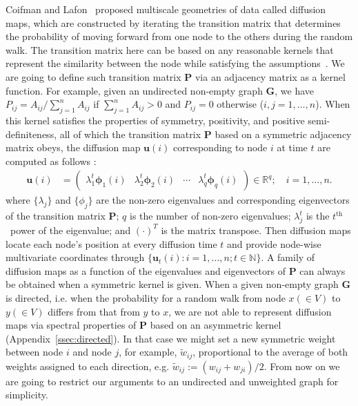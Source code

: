 \documentclass[11pt]{article}
\theoremstyle{definition}
\begin{document}
Coifman and Lafon~\cite{coifman2006diffusion,lafon2006diffusion} proposed multiscale geometries of data called diffusion maps, which are constructed by iterating the transition matrix that determines the probability of moving forward from one node to the others during the random walk. The transition matrix here can be based on any reasonable kernels that represent the similarity between the node while satisfying the assumptions~\cite{coifman2006diffusion, coifman2005geometric}. We are going to define such transition matrix $\mathbf{P}$ via an adjacency matrix as a kernel function. For example, given an undirected non-empty graph $\mathbf{G}$, we have $P_{ij} = A_{ij} / \sum\limits_{j=1}^{n} A_{ij}$ if $\sum\limits_{j=1}^{n} A_{ij} > 0$ and $P_{ij} = 0$ otherwise ($i,j=1,\ldots,n$). When this kernel satisfies the properties of symmetry, positivity, and positive semi-definiteness, all of which the transition matrix $\mathbf{P}$ based on a symmetric adjacency matrix obeys, the diffusion map $\mathbf{u}(i)$ corresponding to node $i$ at time $t$ are computed as follows : 
\begin{align}
\mathbf{u}(i)  &= \begin{pmatrix} \lambda^{t}_{1} \mathbf{\phi}_{1}(i) & \lambda^{t}_{2} \mathbf{\phi}_{2} (i)  & \cdots & \lambda^{t}_{q} \mathbf{\phi}_{q}(i) \end{pmatrix} \in \mathbb{R}^{q}; \quad i = 1, \ldots, n.
\end{align}
where $\{ \lambda_{j} \}$ and $\{ \phi_{j}  \}$ are the non-zero eigenvalues and corresponding eigenvectors of the transition matrix $\mathbf{P}$; $q$ is the number of non-zero eigenvalues; $\lambda^{t}_{j}$ is the $t^{\mbox{th}}$~power of the eigenvalue; and $(\cdot)^{T}$ is the matrix transpose. Then diffusion maps locate each node's position at every diffusion time $t$ and provide node-wise multivariate coordinates through $\{\mathbf{u}_{t}(i) : i = 1, \ldots, n;  t  \in \mathbb{N} \}$. A family of diffusion maps as a function of the eigenvalues and eigenvectors of $\mathbf{P}$ can always be obtained when a symmetric kernel is given. When a given non-empty graph $\mathbf{G}$ is directed, i.e. when the probability for a random walk from node $x (\in V)$ to $y (\in V)$ differs from that from $y$ to $x$, we are not able to represent diffusion maps via spectral properties of $\mathbf{P}$ based on an asymmetric kernel~\cite{tang2010graph} (Appendix~\ref{ssec:directed}). In that case we might set a new symmetric weight between node $i$ and node $j$, for example, $\tilde{w}_{ij}$, proportional to the average of both weights assigned to each direction, e.g. $\tilde{w}_{ij} := (w_{ij} + w_{ji} ) / 2$. From now on we are going to restrict our arguments to an undirected and unweighted graph for simplicity.
\end{document}
